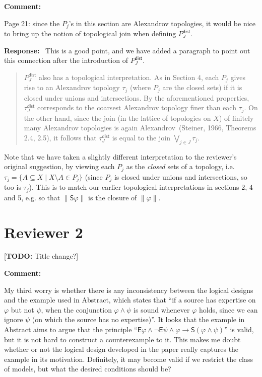 \documentclass[12pt]{article}
\newcommand\todo[1]{{\color{red} [\textbf{TODO:} {#1}]}}
\newenvironment{comment}{
    \noindent\textbf{Comment:}\
    \em
}{\vspace{5mm}}
\newenvironment{response}{
    \noindent\textbf{Response:}\
}{\vspace{5mm}}
\renewcommand{\phi}{\varphi}
\newcommand{\E}{\mathsf{E}}
\renewcommand{\S}{\mathsf{S}}
\begin{document}
\begin{comment}
    Page 21: since the $P_j$'s in this section are Alexandrov topologies, it
    would be nice to bring up the notion of topological join when defining
    $P^\mathsf{dist}_J$.
\end{comment}

\begin{response}
    This is a good point, and we have added a paragraph to point out this
    connection after the introduction of $P^\mathsf{dist}_J$.

    \begin{quotation}
        $P^\mathsf{dist}_J$ also has a topological interpretation. As in
        Section 4, each $P_j$ gives rise to an Alexandrov topology $\tau_j$
        (where $P_j$ are the closed sets) if it is closed under unions and
        intersections. By the aforementioned properties, $\tau^\mathsf{dist}_J$
        corresponds to the coarsest Alexandrov topology finer than each
        $\tau_j$. On the other hand, since the join (in the lattice of
        topologies on $X$) of finitely many Alexandrov topologies is again
        Alexandrov~(Steiner, 1966, Theorems 2.4, 2.5), it follows that
        $\tau^\mathsf{dist}_J$ is equal to the join $\bigvee_{j \in
        J}{\tau_j}$.
    \end{quotation}

    Note that we have taken a slightly different interpretation to the
    reviewer's original suggestion, by viewing each $P_j$ as the \emph{closed}
    sets of a topology, i.e. $\tau_j = \{A \subseteq X \mid X \setminus A \in
    P_j\}$ (since $P_j$ is closed under unions and intersections, so too is
    $\tau_j$). This is to match our earlier topological interpretations in
    sections 2, 4 and 5, e.g. so that $\|\S\phi\|$ is the closure of
    $\|\phi\|$.

\end{response}

\section*{Reviewer 2}

\todo{Title change?}

\begin{comment}
    My third worry is whether there is any inconsistency between the logical
    designs and the example used in Abstract, which states that ``if a source
    has expertise on $\phi$ but not $\psi$, when the conjunction $\phi \land
    \psi$ is sound whenever $\phi$ holds, since we can ignore $\psi$ (on which
    the source has no expertise)''. It looks that the example in Abstract aims
    to argue that the principle ``$\E\phi \land \neg\E\psi \land \phi
    \rightarrow \S(\phi \land \psi)$'' is valid, but it is not hard to
    construct a counterexample to it. This makes me doubt whether or not the
    logical design developed in the paper really captures the example in its
    motivation. Definitely, it may become valid if we restrict the class of
    models, but what the desired conditions should be?
\end{comment}
\end{document}
